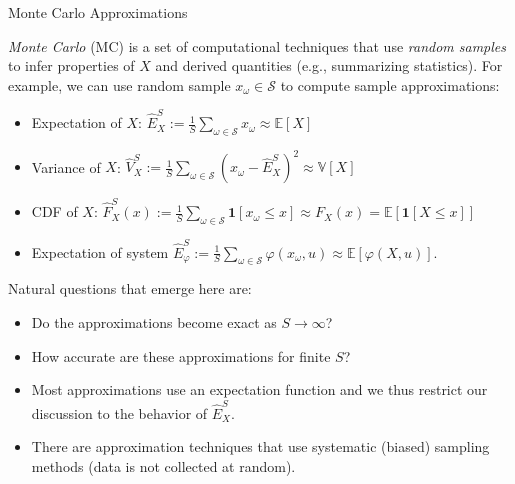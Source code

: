 \documentclass[9pt]{beamer}
\begin{document}
%
\begin{frame}{Monte Carlo Approximations}

{\em Monte Carlo} (MC) is a set of computational techniques that use {\em random samples} to infer properties of $X$ and derived quantities (e.g., summarizing statistics).  For example, we can use random sample $x_\omega \in \mathcal{S}$ to compute sample approximations:
\begin{block}{}
\begin{itemize}
\item Expectation of $X$: $\hat{E}_X^S:=\frac{1}{S}\sum_{\omega \in \mathcal{S}}x_\omega\approx \mathbb{E}[X]$
\item Variance of $X$: $\hat{V}_X^S:=\frac{1}{S}\sum_{\omega \in \mathcal{S}}(x_\omega-\hat{E}_X^S)^2\approx \mathbb{V}[X]$
\item CDF of $X$: $\hat{F}_X^S(x):=\frac{1}{S}\sum_{\omega 
\in \mathcal{S}}\mathbf{1}[x_\omega \leq x]\approx F_X(x)=\mathbb{E}[{\mathbf{1}[X \leq x]}]$
\item Expectation of system $\hat{E}_\varphi^S:=\frac{1}{S}\sum_{\omega 
\in \mathcal{S}}\varphi(x_\omega,u)\approx \mathbb{E}[{\varphi(X,u)}]$. 
\end{itemize}
\end{block}
Natural questions that emerge here are: 
\begin{block}{}
\begin{itemize}
\item Do the approximations become exact as $S\to \infty$?
\item How accurate are these approximations for finite $S$?
\end{itemize}
\end{block}
\begin{itemize}
\item Most approximations use an expectation function and we thus restrict our discussion to the behavior of $\hat{E}_X^S$. 
\item There are approximation techniques that use systematic (biased) sampling methods (data is not collected at random). 
\end{itemize}
\end{frame}
\end{document}
